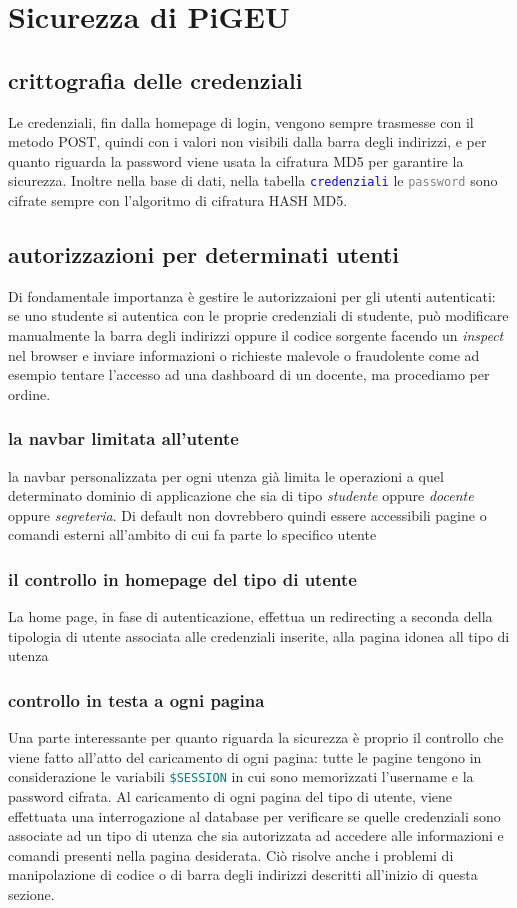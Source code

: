 \documentclass{article}
\newcommand{\tabb}[1]{\texttt{\textcolor{blue}{#1}}}
\newcommand{\attr}[1]{\texttt{\textcolor{gray}{#1}}}
\newcommand{\sqltrigger}[1]{\texttt{\textcolor{teal}{#1}}}
\newcommand{\und}[0]{\textunderscore}
\begin{document}
\section{Sicurezza di PiGEU}
\subsection{crittografia delle credenziali}
Le credenziali, fin dalla homepage di login, vengono sempre trasmesse con il metodo POST, quindi con i valori non visibili dalla barra degli indirizzi, e per quanto riguarda la password viene usata la cifratura MD5 per garantire la sicurezza.
Inoltre nella base di dati, nella tabella \tabb{credenziali} le \attr{password} sono cifrate sempre con l'algoritmo di cifratura HASH MD5.
\subsection{autorizzazioni per determinati utenti}
Di fondamentale importanza è gestire le autorizzaioni per gli utenti autenticati: se uno studente si autentica con le proprie credenziali di studente, può modificare manualmente la barra degli indirizzi oppure il codice sorgente facendo un \textit{inspect} nel browser e inviare informazioni o richieste malevole o fraudolente come ad esempio tentare l'accesso ad una dashboard di un docente, ma procediamo per ordine.
\subsubsection{la navbar limitata all'utente}
la navbar personalizzata per ogni utenza già limita le operazioni a quel determinato dominio di applicazione che sia di tipo \textit{studente} oppure \textit{docente} oppure \textit{segreteria}. Di default non dovrebbero quindi essere accessibili pagine o comandi esterni all'ambito di cui fa parte lo specifico utente
\subsubsection{il controllo in homepage del tipo di utente}
La home page, in fase di autenticazione, effettua un redirecting a seconda della tipologia di utente associata alle credenziali inserite, alla pagina idonea all tipo di utenza
\subsubsection{controllo in testa a ogni pagina}
Una parte interessante per quanto riguarda la sicurezza è proprio il controllo che viene fatto all'atto del caricamento di ogni pagina: tutte le pagine tengono in considerazione le variabili \sqltrigger{\$\und SESSION} in cui sono memorizzati l'username e la password cifrata. Al caricamento di ogni pagina del tipo di utente, viene effettuata una interrogazione al database per verificare se quelle credenziali sono associate ad un tipo di utenza che sia autorizzata ad accedere alle informazioni e comandi presenti nella pagina desiderata. Ciò risolve anche i problemi di manipolazione di codice o di barra degli indirizzi descritti all'inizio di questa sezione.
\end{document}
